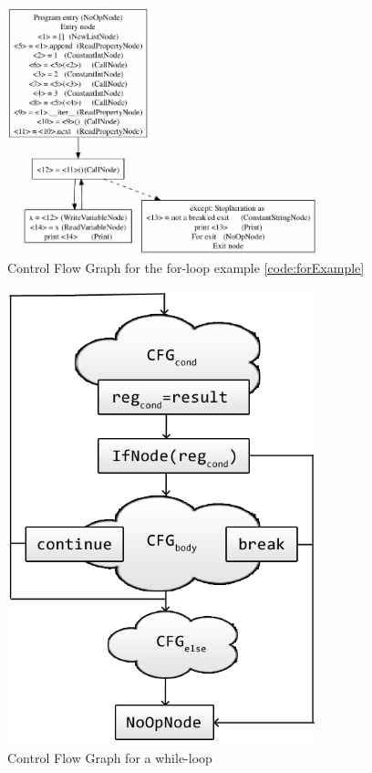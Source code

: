 \begin{figure}[p]
	\centering
	\includegraphics[width=0.8\textwidth]{images/for-example-cfg.png}
	\caption{Control Flow Graph for the for-loop example \ref{code:forExample}}
	\label{fig:forCfg}
\end{figure}

\begin{figure}[p]
	\centering
	\includegraphics[width=0.8\textwidth]{images/while.png}
	\caption{Control Flow Graph for a while-loop}
	\label{fig:whileCfg}
\end{figure}

